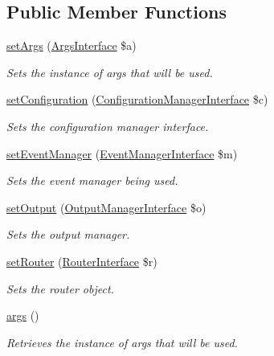 \subsection*{Public Member Functions}
\begin{DoxyCompactItemize}
\item 
\hyperlink{classGenericPlugin_abf0b12b47909ef3c4dada146ea775526}{set\-Args} (\hyperlink{interfaceArgsInterface}{Args\-Interface} \$a)
\begin{DoxyCompactList}\small\item\em Sets the instance of args that will be used. \end{DoxyCompactList}\item 
\hyperlink{classGenericPlugin_a009c5398920a9672a2f13af38756fd5f}{set\-Configuration} (\hyperlink{interfaceConfigurationManagerInterface}{Configuration\-Manager\-Interface} \$c)
\begin{DoxyCompactList}\small\item\em Sets the configuration manager interface. \end{DoxyCompactList}\item 
\hyperlink{classGenericPlugin_afc683b68f471d89aa6a95daebcbfe28a}{set\-Event\-Manager} (\hyperlink{interfaceEventManagerInterface}{Event\-Manager\-Interface} \$m)
\begin{DoxyCompactList}\small\item\em Sets the event manager being used. \end{DoxyCompactList}\item 
\hyperlink{classGenericPlugin_a00fb20d417f3ad2f9839591a84348218}{set\-Output} (\hyperlink{interfaceOutputManagerInterface}{Output\-Manager\-Interface} \$o)
\begin{DoxyCompactList}\small\item\em Sets the output manager. \end{DoxyCompactList}\item 
\hyperlink{classGenericPlugin_ac03553d95ea0e2d5023e3f78ef85f4b9}{set\-Router} (\hyperlink{interfaceRouterInterface}{Router\-Interface} \$r)
\begin{DoxyCompactList}\small\item\em Sets the router object. \end{DoxyCompactList}\item 
\hyperlink{classGenericPlugin_a1ce2fea9e153e37e019ff4b72fd3b819}{args} ()
\begin{DoxyCompactList}\small\item\em Retrieves the instance of args that will be used. \end{DoxyCompactList}\item 

\end{DoxyCompactItemize}
